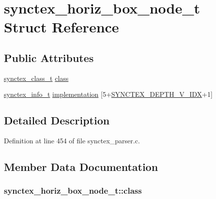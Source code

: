 \hypertarget{structsynctex__horiz__box__node__t}{\section{synctex\+\_\+horiz\+\_\+box\+\_\+node\+\_\+t Struct Reference}
\label{structsynctex__horiz__box__node__t}
}
\subsection*{Public Attributes}
\begin{DoxyCompactItemize}
\item 
\hyperlink{synctex__parser_8c_a68d11a2cb22716e7abd35cffed7d54c5}{synctex\+\_\+class\+\_\+t} \hyperlink{structsynctex__horiz__box__node__t_a1bae222025e1729d1196ef37b05a409a}{class}
\item 
\hyperlink{synctex__parser_8c_a864f981cdab43a24765efb685074cf70}{synctex\+\_\+info\+\_\+t} \hyperlink{structsynctex__horiz__box__node__t_a085cd606e3075bd170e59e33b48c506d}{implementation} \mbox{[}5+\hyperlink{synctex__parser_8c_a7d4c8a7d9c1d7ffee27db3895e0411bd}{S\+Y\+N\+C\+T\+E\+X\+\_\+\+D\+E\+P\+T\+H\+\_\+\+V\+\_\+\+I\+D\+X}+1\mbox{]}
\end{DoxyCompactItemize}


\subsection{Detailed Description}


Definition at line 454 of file synctex\+\_\+parser.\+c.



\subsection{Member Data Documentation}
\hypertarget{structsynctex__horiz__box__node__t_a1bae222025e1729d1196ef37b05a409a}{
\subsubsection[{class}]{ synctex\+\_\+horiz\+\_\+box\+\_\+node\+\_\+t\+::class}}\label{structsynctex__horiz__box__node__t_a1bae222025e1729d1196ef37b05a409a}


